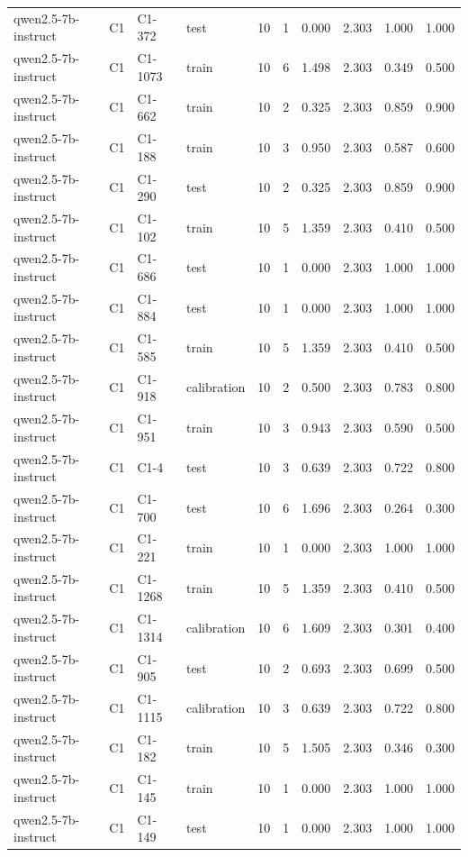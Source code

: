 \begin{table}
\begin{tabular}{llllrrrrrr}
qwen2.5-7b-instruct & C1 & C1-372 & test & 10 & 1 & 0.000 & 2.303 & 1.000 & 1.000 \\
qwen2.5-7b-instruct & C1 & C1-1073 & train & 10 & 6 & 1.498 & 2.303 & 0.349 & 0.500 \\
qwen2.5-7b-instruct & C1 & C1-662 & train & 10 & 2 & 0.325 & 2.303 & 0.859 & 0.900 \\
qwen2.5-7b-instruct & C1 & C1-188 & train & 10 & 3 & 0.950 & 2.303 & 0.587 & 0.600 \\
qwen2.5-7b-instruct & C1 & C1-290 & test & 10 & 2 & 0.325 & 2.303 & 0.859 & 0.900 \\
qwen2.5-7b-instruct & C1 & C1-102 & train & 10 & 5 & 1.359 & 2.303 & 0.410 & 0.500 \\
qwen2.5-7b-instruct & C1 & C1-686 & test & 10 & 1 & 0.000 & 2.303 & 1.000 & 1.000 \\
qwen2.5-7b-instruct & C1 & C1-884 & test & 10 & 1 & 0.000 & 2.303 & 1.000 & 1.000 \\
qwen2.5-7b-instruct & C1 & C1-585 & train & 10 & 5 & 1.359 & 2.303 & 0.410 & 0.500 \\
qwen2.5-7b-instruct & C1 & C1-918 & calibration & 10 & 2 & 0.500 & 2.303 & 0.783 & 0.800 \\
qwen2.5-7b-instruct & C1 & C1-951 & train & 10 & 3 & 0.943 & 2.303 & 0.590 & 0.500 \\
qwen2.5-7b-instruct & C1 & C1-4 & test & 10 & 3 & 0.639 & 2.303 & 0.722 & 0.800 \\
qwen2.5-7b-instruct & C1 & C1-700 & test & 10 & 6 & 1.696 & 2.303 & 0.264 & 0.300 \\
qwen2.5-7b-instruct & C1 & C1-221 & train & 10 & 1 & 0.000 & 2.303 & 1.000 & 1.000 \\
qwen2.5-7b-instruct & C1 & C1-1268 & train & 10 & 5 & 1.359 & 2.303 & 0.410 & 0.500 \\
qwen2.5-7b-instruct & C1 & C1-1314 & calibration & 10 & 6 & 1.609 & 2.303 & 0.301 & 0.400 \\
qwen2.5-7b-instruct & C1 & C1-905 & test & 10 & 2 & 0.693 & 2.303 & 0.699 & 0.500 \\
qwen2.5-7b-instruct & C1 & C1-1115 & calibration & 10 & 3 & 0.639 & 2.303 & 0.722 & 0.800 \\
qwen2.5-7b-instruct & C1 & C1-182 & train & 10 & 5 & 1.505 & 2.303 & 0.346 & 0.300 \\
qwen2.5-7b-instruct & C1 & C1-145 & train & 10 & 1 & 0.000 & 2.303 & 1.000 & 1.000 \\
qwen2.5-7b-instruct & C1 & C1-149 & test & 10 & 1 & 0.000 & 2.303 & 1.000 & 1.000 \\

\end{tabular}
\end{table}

